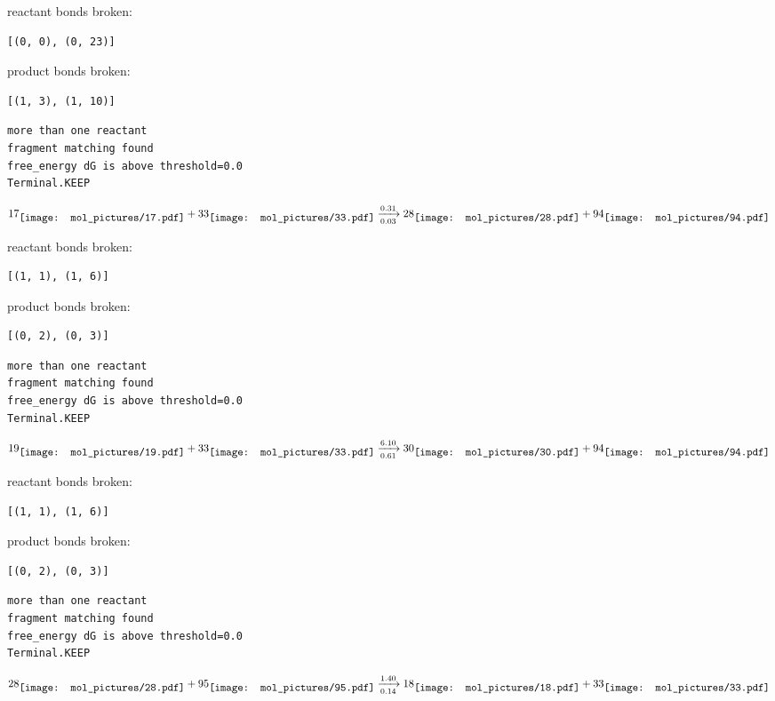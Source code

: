 \documentclass{article}
\begin{document}
reactant bonds broken:\begin{verbatim}
[(0, 0), (0, 23)]
\end{verbatim}
product bonds broken:\begin{verbatim}
[(1, 3), (1, 10)]
\end{verbatim}




\vspace{1cm}
\begin{verbatim}
more than one reactant
fragment matching found
free_energy dG is above threshold=0.0
Terminal.KEEP
\end{verbatim}
$$
17
\raisebox{-.5\height}{\texttt{[image: mol\_pictures/17.pdf]}}
+
33
\raisebox{-.5\height}{\texttt{[image: mol\_pictures/33.pdf]}}
\xrightarrow[0.03]{0.31}
28
\raisebox{-.5\height}{\texttt{[image: mol\_pictures/28.pdf]}}
+
94
\raisebox{-.5\height}{\texttt{[image: mol\_pictures/94.pdf]}}
$$


reactant bonds broken:\begin{verbatim}
[(1, 1), (1, 6)]
\end{verbatim}
product bonds broken:\begin{verbatim}
[(0, 2), (0, 3)]
\end{verbatim}




\vspace{1cm}
\begin{verbatim}
more than one reactant
fragment matching found
free_energy dG is above threshold=0.0
Terminal.KEEP
\end{verbatim}
$$
19
\raisebox{-.5\height}{\texttt{[image: mol\_pictures/19.pdf]}}
+
33
\raisebox{-.5\height}{\texttt{[image: mol\_pictures/33.pdf]}}
\xrightarrow[0.61]{6.10}
30
\raisebox{-.5\height}{\texttt{[image: mol\_pictures/30.pdf]}}
+
94
\raisebox{-.5\height}{\texttt{[image: mol\_pictures/94.pdf]}}
$$


reactant bonds broken:\begin{verbatim}
[(1, 1), (1, 6)]
\end{verbatim}
product bonds broken:\begin{verbatim}
[(0, 2), (0, 3)]
\end{verbatim}




\vspace{1cm}
\begin{verbatim}
more than one reactant
fragment matching found
free_energy dG is above threshold=0.0
Terminal.KEEP
\end{verbatim}
$$
28
\raisebox{-.5\height}{\texttt{[image: mol\_pictures/28.pdf]}}
+
95
\raisebox{-.5\height}{\texttt{[image: mol\_pictures/95.pdf]}}
\xrightarrow[0.14]{1.40}
18
\raisebox{-.5\height}{\texttt{[image: mol\_pictures/18.pdf]}}
+
33
\raisebox{-.5\height}{\texttt{[image: mol\_pictures/33.pdf]}}
$$
\end{document}
